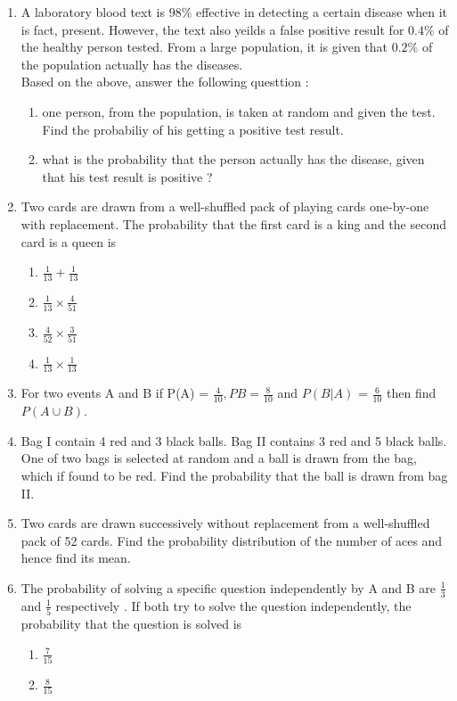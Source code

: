 \begin{enumerate}[label=\thesection.\arabic*.,ref=\thesection.\theenumi]
\item A laboratory blood text is $98\%$ effective  in detecting a certain disease when it is fact, present. However, the text also yeilds a false positive result for $0.4\%$ of the healthy person tested. From a large population, it is given that $0.2\%$ of the population actually has the diseases.
\\Based on the above, answer the following questtion : 
\begin{enumerate}
\item one person, from the population, is taken at random and given the test. Find the probabiliy of his getting a positive test result.
\item what is the probability that the person actually has the disease, given that his test result is positive ?
\end{enumerate}
\item Two cards are drawn from a well-shuffled pack of playing cards one-by-one with replacement. The probability that the first card is a king and the second card is a queen is 
\begin{enumerate}
\item $\frac{1}{13} + \frac{1}{13}$
\item $ \frac{1}{13} \times \frac{4}{51}$
\item $\frac{4}{52} \times \frac{3}{51}$
\item $\frac{1}{13} \times \frac{1}{13}$
\end{enumerate}
\item For two events A and B if P(A) = $\frac{4}{10}, P{B} = \frac{8}{10}$ and $P(B|A)$ = $\frac{6}{10}$ then find $P( A \cup B).$
\item Bag I contain 4 red and 3 black balls. Bag II contains 3 red and 5 black balls. One of two bags is selected at random and a ball is drawn from the bag, which if found to be red. Find the probability that the ball is drawn from bag II.
\item Two cards are drawn successively without replacement from a well-shuffled pack of 52 cards. Find the probability distribution of the number of aces and hence find its mean.
\item The probability of solving a specific question independently by A and B are $\frac{1}{3}$ and $\frac{1}{5}$ respectively . If both try to solve the question independently, the probability that the question is solved is 
\begin{enumerate}
\item $\frac{7}{15}$
\item $\frac{8}{15}$

\end{enumerate}
\end{enumerate}

